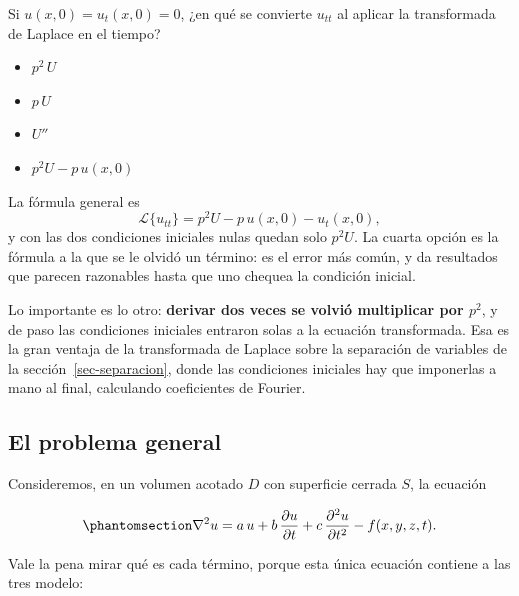 \documentclass[
  spanish,
  a4paper,
]{scrbook}
\providecommand{\tightlist}{%
  \setlength{\itemsep}{0pt}\setlength{\parskip}{0pt}}
\theoremstyle{definition}
\theoremstyle{plain}
\theoremstyle{definition}
\theoremstyle{plain}
\theoremstyle{definition}
\theoremstyle{remark}
\begin{document}
Si \(u(x,0)=u_t(x,0)=0\), ¿en qué se convierte \(u_{tt}\) al aplicar la
transformada de Laplace en el tiempo?

\begin{itemize}
\tightlist
\item
  {\(p^2\,U\)}
\item
  {\(p\,U\)}
\item
  {\(U''\)}
\item
  {\(p^2 U - p\,u(x,0)\)}
\end{itemize}

La fórmula general es
\[\mathcal{L}\{u_{tt}\} = p^2U - p\,u(x,0) - u_t(x,0),\] y con las dos
condiciones iniciales nulas quedan solo \(p^2U\). La cuarta opción es la
fórmula a la que se le olvidó un término: es el error más común, y da
resultados que parecen razonables hasta que uno chequea la condición
inicial.

Lo importante es lo otro: \textbf{derivar dos veces se volvió
multiplicar por \(p^2\)}, y de paso las condiciones iniciales entraron
solas a la ecuación transformada. Esa es la gran ventaja de la
transformada de Laplace sobre la separación de variables de la
sección~\ref{sec-separacion}, donde las condiciones iniciales hay que
imponerlas a mano al final, calculando coeficientes de Fourier.

\subsection{El problema
general}\label{sec-problema-general-transformadas}

Consideremos, en un volumen acotado \(D\) con superficie cerrada \(S\),
la ecuación

\begin{equation}\protect\phantomsection\label{eq-general-transformadas}{
\nabla^2 u = a\,u + b\,\frac{\partial u}{\partial t} + c\,\frac{\partial^2 u}{\partial t^2}
- f(x,y,z,t) .
}\end{equation}

Vale la pena mirar qué es cada término, porque esta única ecuación
contiene a las tres modelo:
\end{document}
